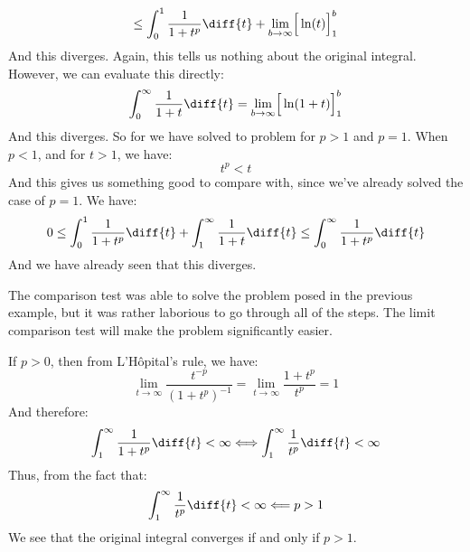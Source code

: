 \begin{lexample}
\begin{equation}
                \leq\int_{0}^{1}\frac{1}{1+t^{p}}\diff{t}+
                \underset{b\rightarrow\infty}{\lim}
                \Big[\ln(t)\Big]_{1}^{b}
            \end{equation}
            And this diverges. Again, this tells us nothing about
            the original integral. However, we can evaluate this
            directly:
            \begin{equation}
                \int_{0}^{\infty}\frac{1}{1+t}\diff{t}=
                \underset{b\rightarrow\infty}{\lim}
                \Big[\ln(1+t)\Big]_{1}^{b}
            \end{equation}
            And this diverges. So for we have solved to problem
            for $p>1$ and $p=1$. When $p<1$, and for $t>1$, we have:
            \begin{equation}
                t^{p}<t
            \end{equation}
            And this gives us something good to compare with,
            since we've already solved the case of $p=1$. We have:
            \begin{equation}
                0\leq\int_{0}^{1}\frac{1}{1+t^{p}}\diff{t}
                +\int_{1}^{\infty}\frac{1}{1+t}\diff{t}
                \leq\int_{0}^{\infty}\frac{1}{1+t^{p}}\diff{t}
            \end{equation}
            And we have already seen that this diverges.
        \end{lexample}
        The comparison test was able to solve the problem posed in
        the previous example, but it was rather laborious to go
        through all of the steps. The limit comparison test will make
        the problem significantly easier.
        \begin{lexample}
            If $p>0$, then from L'H\^{o}pital's rule, we have:
            \begin{equation}
                \underset{t\rightarrow\infty}{\lim}
                \frac{t^{\minus{p}}}{(1+t^{p})^{\minus{1}}}
                =\underset{t\rightarrow\infty}{\lim}
                    \frac{1+t^{p}}{t^{p}}=1
            \end{equation}
            And therefore:
            \begin{equation}
                \int_{1}^{\infty}\frac{1}{1+t^{p}}\diff{t}<\infty
                \Longleftrightarrow
                \int_{1}^{\infty}\frac{1}{t^{p}}\diff{t}<\infty
            \end{equation}
            Thus, from the fact that:
            \begin{equation}
                \int_{1}^{\infty}\frac{1}{t^{p}}\diff{t}<\infty
                \Longleftarrow
                p>1
            \end{equation}
            We see that the original integral converges if and only
            if $p>1$.
        \end{lexample}
